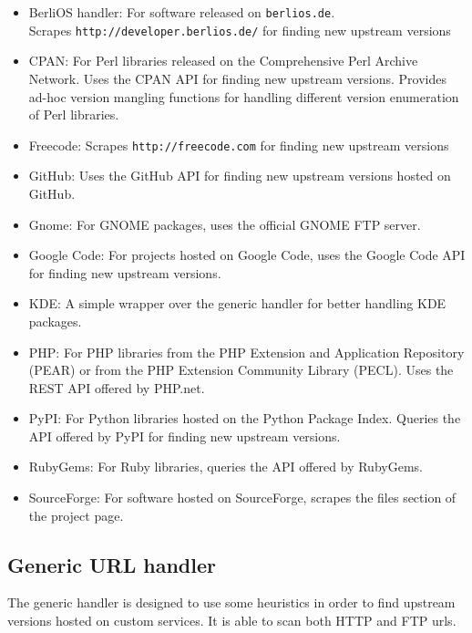 \begin{itemize}
\item BerliOS handler: For software released on \texttt{berlios.de}. \\ Scrapes \texttt{http://developer.berlios.de/} for finding new upstream versions
\item CPAN: For Perl libraries released on the Comprehensive Perl Archive Network. Uses the CPAN API for finding new upstream versions. Provides ad-hoc version mangling functions for handling different version enumeration of Perl libraries.
\item Freecode: Scrapes \texttt{http://freecode.com} for finding new upstream versions
\item GitHub: Uses the GitHub API for finding new upstream versions hosted on GitHub.
\item Gnome: For GNOME packages, uses the official GNOME FTP server.
\item Google Code: For projects hosted on Google Code, uses the Google Code API for finding new upstream versions.
\item KDE: A simple wrapper over the generic handler for better handling KDE packages.
\item PHP: For PHP libraries from the PHP Extension and Application Repository (PEAR) or from the PHP Extension Community Library (PECL). Uses the REST API offered by PHP.net.
\item PyPI: For Python libraries hosted on the Python Package Index. Queries the API offered by PyPI for finding new upstream versions.
\item RubyGems: For Ruby libraries, queries the API offered by RubyGems.
\item SourceForge: For software hosted on SourceForge, scrapes the files section of the  project page.
\end{itemize}


\subsection{Generic URL handler}
The generic handler is designed to use some heuristics in order to find upstream versions hosted on custom services. It is able to scan both HTTP and FTP urls.

